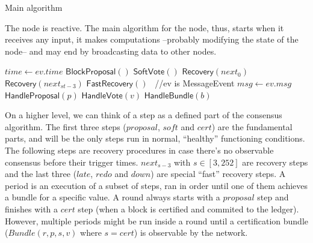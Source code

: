 \documentclass[10pt,a4paper]{article}
\begin{document}
\begin{section}{Main algorithm}
%

The node is reactive. The main algorithm for the node, thus, starts when it receives 
any input, it makes computations --probably modifying the state of the node-- and 
may end by broadcasting data to other nodes.

\begin{algorithm}[H]
    \caption{\underline{Main node algorithm}}
    \label{algo:main}
    \begin{algorithmic}[1]
    
        \State $time \gets ev.time$
            \State $\mathsf{BlockProposal}()$
            \State $\mathsf{SoftVote}()$
            \State $\mathsf{Recovery}(next_0)$
            \State $\mathsf{Recovery}(next_{st-3})$
            \State $\mathsf{FastRecovery}()$
        \EndIf
    \Else \ //ev is MessageEvent
        \State $msg \gets ev.msg$
            \State $\mathsf{HandleProposal}(p)$
            \State $\mathsf{HandleVote}(v)$
            \State $\mathsf{HandleBundle}(b)$
        \EndIf
    \EndIf

    \EndFunction
    \end{algorithmic}
\end{algorithm}

On a higher level, we can think of a step as a defined part of the consensus algorithm. The first three steps
($proposal$, $soft$ and $cert$)
are the fundamental parts, and will be the only steps run in normal, ``healthy'' functioning conditions.
The following steps are recovery procedures in case there's no observable consensus before their trigger times.
$next_{s-3}$ with $s \in [3, 252]$ are recovery steps and the last three ($late$, $redo$ and $down$)
are special ``fast'' recovery steps.
A period is an execution of a subset of steps, ran in order until one of them achieves 
a bundle for a specific value. A round always starts with a $proposal$ step and finishes with a $cert$
step (when a block is certified and commited to the ledger). However, multiple periods might
be run inside a round until a certification bundle ($Bundle(r,p,s,v) $ where $s = cert$) is observable by the network.


\end{section}
\end{document}
